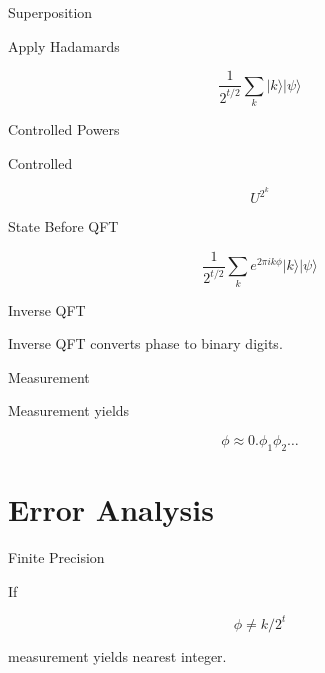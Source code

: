 \documentclass{beamer}
\begin{document}

\begin{frame}{Superposition}

Apply Hadamards

\[
\frac{1}{2^{t/2}}
\sum_k |k\rangle |\psi\rangle
\]

\end{frame}


\begin{frame}{Controlled Powers}

Controlled

\[
U^{2^k}
\]

\end{frame}


\begin{frame}{State Before QFT}

\[
\frac{1}{2^{t/2}}
\sum_k e^{2\pi i k\phi}|k\rangle|\psi\rangle
\]

\end{frame}


\begin{frame}{Inverse QFT}

Inverse QFT converts phase to binary digits.

\end{frame}


\begin{frame}{Measurement}

Measurement yields

\[
\phi \approx 0.\phi_1\phi_2\dots
\]

\end{frame}

\section{Error Analysis}

\begin{frame}{Finite Precision}

If

\[
\phi\neq k/2^t
\]

measurement yields nearest integer.

\end{frame}
\end{document}
